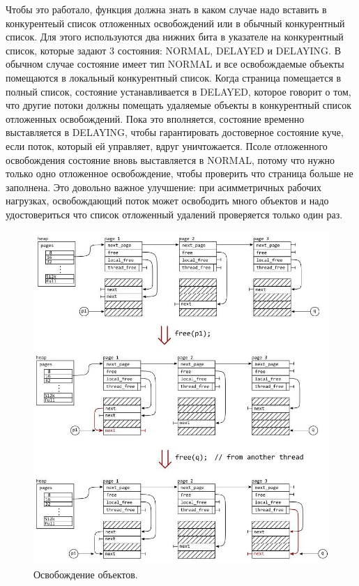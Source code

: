 Чтобы это работало, функция должна знать в каком случае надо вставить в конкурентеый список отложенных освобождений или в обычный конкурентный список. Для этого используются два нижних бита в указателе на конкурентный список, которые задают 3 состояния: NORMAL, DELAYED и DELAYING. В обычном случае состояние имеет тип NORMAL и все освобождаемые объекты помещаются в локальный конкурентный список. Когда страница помещается в полный список, состояние устанавливается в DELAYED, которое говорит о том, что другие потоки должны помещать удаляемые объекты в конкурентный список отложенных освобождений. Пока это вполняется, состояние временно выставляется в DELAYING, чтобы гарантировать достоверное состояние куче, если поток, который ей управляет, вдруг уничтожается. Псоле отложенного освобождения состояние вновь выставляется в NORMAL, потому что нужно только одно отложенное освобождение, чтобы проверить что страница больше не заполнена. Это довольно важное улучшение: при асимметричных рабочих нагрузках, освобождающий поток может освободить много объектов и надо удостовериться что список отложенный удалений проверяется только один раз.

\begin{figure}[!h]
	\begin{center}
		\includegraphics[scale=0.8]{images/mimalloc-free.jpg}
		\caption{Освобождение объектов.}
		\label{mimalloc-free}
	\end{center}
\end{figure}

